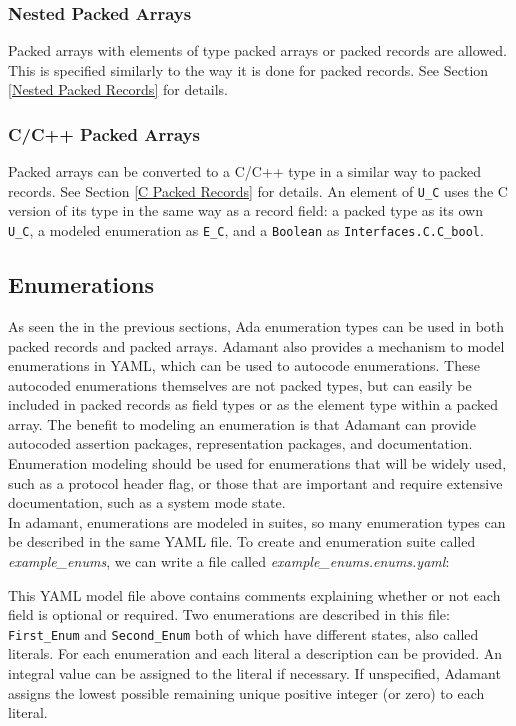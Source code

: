 \subsubsection{Nested Packed Arrays}

Packed arrays with elements of type packed arrays or packed records are allowed. This is specified similarly to the way it is done for packed records. See Section \ref{Nested Packed Records} for details.

\subsubsection{C/C++ Packed Arrays}

Packed arrays can be converted to a C/C++ type in a similar way to packed records. See Section \ref{C Packed Records} for details. An element of \texttt{U\_C} uses the C version of its type in the same way as a record field: a packed type as its own \texttt{U\_C}, a modeled enumeration as \texttt{E\_C}, and a \texttt{Boolean} as \texttt{Interfaces.C.C\_bool}.

\subsection{Enumerations}

As seen the in the previous sections, Ada enumeration types can be used in both packed records and packed arrays. Adamant also provides a mechanism to model enumerations in YAML, which can be used to autocode enumerations. These autocoded enumerations themselves are not packed types, but can easily be included in packed records as field types or as the element type within a packed array. The benefit to modeling an enumeration is that Adamant can provide autocoded assertion packages, representation packages, and documentation. Enumeration modeling should be used for enumerations that will be widely used, such as a protocol header flag, or those that are important and require extensive documentation, such as a system mode state. \\

In adamant, enumerations are modeled in suites, so many enumeration types can be described in the same YAML file. To create and enumeration suite called \textit{example\_enums}, we can write a file called \textit{example\_enums.enums.yaml}:


This YAML model file above contains comments explaining whether or not each field is optional or required. Two enumerations are described in this file: \texttt{First\_Enum} and \texttt{Second\_Enum} both of which have different states, also called literals. For each enumeration and each literal a description can be provided. An integral value can be assigned to the literal if necessary. If unspecified, Adamant assigns the lowest possible remaining unique positive integer (or zero) to each literal.

